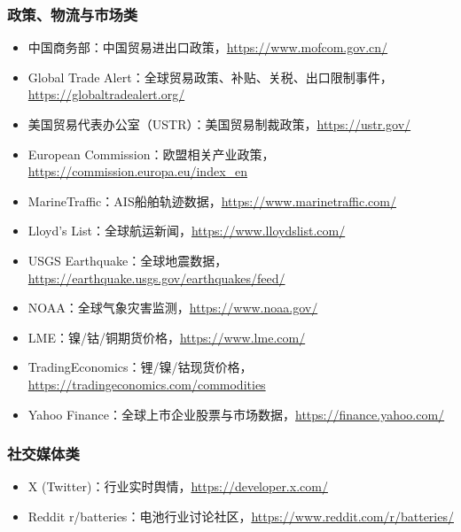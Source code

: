 \documentclass[12pt,a4paper]{article}
\begin{document}
\subsubsection{政策、物流与市场类}
\begin{itemize}
    \item 中国商务部：中国贸易进出口政策，\url{https://www.mofcom.gov.cn/}
    \item Global Trade Alert：全球贸易政策、补贴、关税、出口限制事件，\url{https://globaltradealert.org/}
    \item 美国贸易代表办公室（USTR）：美国贸易制裁政策，\url{https://ustr.gov/}
    \item European Commission：欧盟相关产业政策，\url{https://commission.europa.eu/index_en}
    \item MarineTraffic：AIS船舶轨迹数据，\url{https://www.marinetraffic.com/}
    \item Lloyd’s List：全球航运新闻，\url{https://www.lloydslist.com/}
    \item USGS Earthquake：全球地震数据，\url{https://earthquake.usgs.gov/earthquakes/feed/}
    \item NOAA：全球气象灾害监测，\url{https://www.noaa.gov/}
    \item LME：镍/钴/铜期货价格，\url{https://www.lme.com/}
    \item TradingEconomics：锂/镍/钴现货价格，\url{https://tradingeconomics.com/commodities}
    \item Yahoo Finance：全球上市企业股票与市场数据，\url{https://finance.yahoo.com/}
\end{itemize}

\subsubsection{社交媒体类}
\begin{itemize}
    \item X (Twitter)：行业实时舆情，\url{https://developer.x.com/}
    \item Reddit r/batteries：电池行业讨论社区，\url{https://www.reddit.com/r/batteries/}
\end{itemize}
\end{document}
